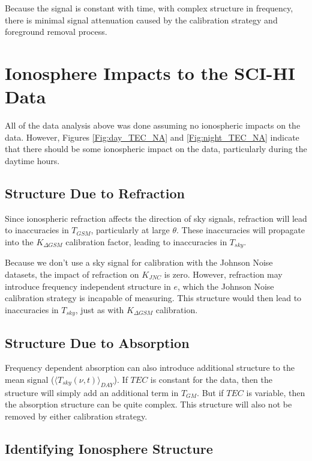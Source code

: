 Because the \cm signal is constant with time, with complex structure in frequency, there is minimal signal attenuation caused by the calibration strategy and foreground removal process. 



\section{Ionosphere Impacts to the SCI-HI Data}

All of the data analysis above was done assuming no ionospheric impacts on the data. However, Figures \ref{Fig:day_TEC_NA} and \ref{Fig:night_TEC_NA} indicate that there should be some ionospheric impact on the data, particularly during the daytime hours. 


\subsection{Structure Due to Refraction} 

Since ionospheric refraction affects the direction of sky signals, refraction will lead to inaccuracies in $T_{GSM}$, particularly at large $\theta$. These inaccuracies will propagate into the $K_{\Delta GSM}$ calibration factor, leading to inaccuracies in $T_{sky}$. 

Because we don't use a sky signal for calibration with the Johnson Noise datasets, the impact of refraction on $K_{JNC}$ is zero. However, refraction may introduce frequency independent structure in $e$, which the Johnson Noise calibration strategy is incapable of measuring. This structure would then lead to inaccuracies in $T_{sky}$, just as with $K_{\Delta GSM}$ calibration. 


\subsection{Structure Due to Absorption}

Frequency dependent absorption can also introduce additional structure to the mean signal ($\langle T_{sky}(\nu,t) \rangle_{DAY}$). If $TEC$ is constant for the data, then the structure will simply add an additional term in $T_{GM}$. But if $TEC$ is variable, then the absorption structure can be quite complex.  This structure will also not be removed by either calibration strategy. 


\subsection{Identifying Ionosphere Structure}

